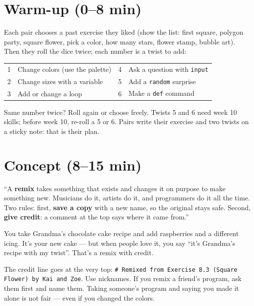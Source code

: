 \section{Warm-up (0--8 min)}
\begin{unplugged}
Each pair chooses a past exercise they liked (show the list: first square, polygon party, square flower, pick a color, how many stars, flower stamp, bubble art). Then they roll the dice twice; each number is a twist to add:
\begin{center}\small
\begin{tabular}{@{}cl@{\qquad}cl@{}}
\toprule
1 & Change colors (use the palette) & 4 & Ask a question with \texttt{input} \\
2 & Change sizes with a variable & 5 & Add a \texttt{random} surprise \\
3 & Add or change a loop & 6 & Make a \texttt{def} command \\
\bottomrule
\end{tabular}
\end{center}
Same number twice? Roll again or choose freely. Twists 5 and 6 need week 10 skills; before week 10, re-roll a 5 or 6. Pairs write their exercise and two twists on a sticky note: that is their plan.
\end{unplugged}

\section{Concept (8--15 min)}
\begin{teacherscript}
\enquote{A \textbf{remix} takes something that exists and changes it on purpose to make something new. Musicians do it, artists do it, and programmers do it all the time. Two rules: first, \textbf{save a copy} with a new name, so the original stays safe. Second, \textbf{give credit}: a comment at the top says where it came from.}
\end{teacherscript}
\begin{analogy}
You take Grandma's chocolate cake recipe and add raspberries and a different icing. It's your new cake --- but when people love it, you say \enquote{it's Grandma's recipe with my twist}. That's a remix with credit.
\end{analogy}
\begin{safety}
The credit line goes at the very top: \texttt{\# Remixed from Exercise 8.3 (Square Flower) by Kai and Zoe}. Use nicknames. If you remix a friend's program, ask them first and name them. Taking someone's program and saying you made it alone is not fair --- even if you changed the colors.
\end{safety}

